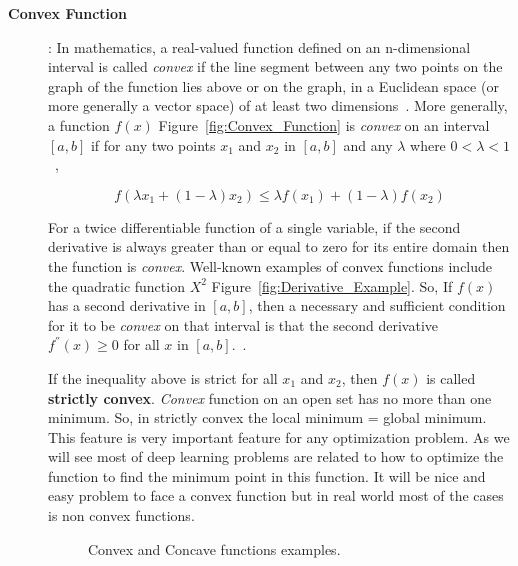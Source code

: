 \begin{description}
  \item [\textbf{Convex Function}]:  In mathematics, a real-valued function defined on an n-dimensional interval is called \textit{convex} if the line segment between any two points on the graph of the function lies above or on the graph, in a Euclidean space (or more generally a vector space) of at least two dimensions~\cite{Wiki_Convex_Function}. More generally, a function $f(x)$ Figure~\ref{fig:Convex_Function} is \textit{convex} on an interval $[a,b]$ if for any two points $x_1$ and $x_2$ in $[a,b]$ and any $\lambda$ where $0<\lambda<1$~\cite{Rudin_1976},

\begin{equation}\label{eq:convex_fun}
  f(\lambda x_1 + (1-\lambda)x_2) \leq \lambda f(x_1) + (1 - \lambda) f(x_2)
\end{equation}

For a twice differentiable function of a single variable, if the second derivative is always greater than or equal to zero for its entire domain then the function is \textit{convex}. Well-known examples of convex functions include the quadratic function $X^2$ Figure~\ref{fig:Derivative_Example}. So, If $f(x)$ has a second derivative in $[a,b]$, then a necessary and sufficient condition for it to be \textit{convex} on that interval is that the second derivative $f^{''}(x) \geq 0$ for all $x$ in $[a,b]$.~\cite{Wolfram_Convex}.

If the inequality above is strict for all $x_1$ and $x_2$, then $f(x)$ is called \textbf{strictly convex}. \textit{Convex} function on an open set has no more than one minimum. So, in strictly convex the local minimum = global minimum. This feature is very important feature for any optimization problem. As we will see most of deep learning problems are related to how to optimize the function to find the minimum point in this function. It will be nice and easy problem to face a convex function but in real world most of the cases is non convex functions.


%


\begin{figure}[!t]
  \centering
\caption{Convex and Concave functions examples.}
\end{figure}



\end{description}
